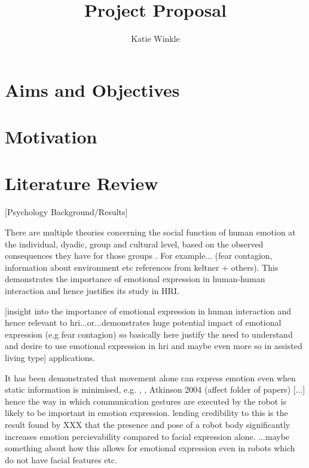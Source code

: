 \documentclass[]{article}
\title{Project Proposal}
\author{Katie Winkle}
\begin{document}
\maketitle

\begin{abstract}

\end{abstract}

\section{Aims and Objectives}
\section{Motivation}
\section{Literature Review}

[Psychology Background/Results]

There are multiple theories concerning the social function of human emotion at the individual, dyadic, group and cultural level, based on the observed consequences they have for those groups \cite{keltner1999social}. For example... (fear contagion, information about environment etc references from keltner + others). This demonstrates the importance of emotional expression in human-human interaction and hence justifies its study in HRI. 

[insight into the importance of emotional expression in human interaction and hence relevant to hri...or...demonstrates huge potential impact of emotional expression (e.g fear contagion) so basically here justify the need to understand and desire to use emotional expression in hri and maybe even more so in assisted living type] applications.

It has been demonstrated that movement alone can express emotion even when static information is minimised, e.g. \cite{dittrich1996perception}, \cite{pollick2001perceiving}, Atkinson 2004 (affect folder of papers) [...] hence the way in which communication gestures are executed by the robot is likely to be important in emotion expression. lending credibility to this is the result found by XXX that the presence and pose of a robot body significantly increases emotion percievability compared to facial expression alone. ...maybe something about how this allows for emotional expression even in robots which do not have facial features etc.  
\end{document}
